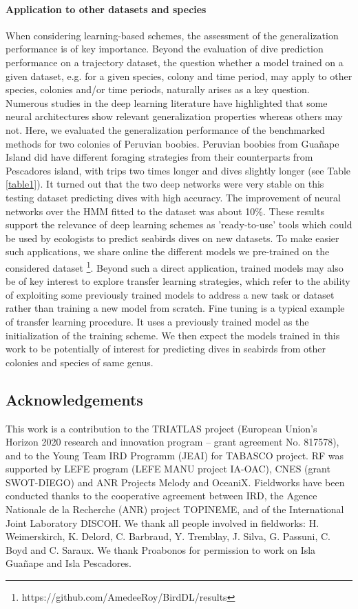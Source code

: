 \documentclass{article}
\begin{document}
\paragraph{Application to other datasets and species}
When considering learning-based schemes, the assessment of the generalization performance is of key importance. Beyond the evaluation of dive prediction performance on a trajectory dataset, the question whether a model trained on a given dataset, e.g. for a given species, colony and time period, may apply to other species, colonies and/or time periods, naturally arises as a key question. Numerous studies in the deep learning literature \citep{kawaguchi_generalization_2020,zhang_understanding_2017} have highlighted that some neural architectures show relevant generalization properties whereas others may not.
Here, we evaluated the generalization performance of the benchmarked methods for two colonies of Peruvian boobies.
Peruvian boobies from  Gua\~nape Island did have different foraging strategies from their counterparts from Pescadores island, with trips two times longer and dives slightly longer (see Table \ref{table1}). It turned out that the two deep networks were very stable on this testing dataset predicting dives with high accuracy. The improvement of neural networks over the HMM fitted to the dataset was about 10\%.
These results support the relevance of deep learning schemes as 
'ready-to-use' tools which could be used by ecologists to predict 
seabirds dives on new datasets. To make easier such applications, we share online the different models we pre-trained on the considered dataset \footnote{https://github.com/AmedeeRoy/BirdDL/results}. 
Beyond such a direct application, trained models may also be of key interest to explore transfer learning strategies, which refer to the ability of exploiting some previously trained models to address a new task or dataset rather than training a new model from scratch. Fine tuning is a typical example of transfer learning procedure. It uses a previously trained model as the initialization of the training scheme. We then expect the models trained in this work to be potentially of interest for predicting dives in seabirds from other colonies and species of same genus.       

\subsection*{Acknowledgements}
This work is a contribution to the TRIATLAS project (European Union's Horizon 2020 research and innovation program – grant agreement No. 817578), and to the Young Team IRD Programm (JEAI) for TABASCO project. RF was supported by LEFE program (LEFE MANU project IA-OAC), CNES (grant SWOT-DIEGO) and ANR Projects Melody and OceaniX. Fieldworks have been conducted thanks to the cooperative agreement between IRD, the Agence Nationale de la Recherche (ANR) project TOPINEME, and of the International Joint Laboratory DISCOH. We thank all people involved in fieldworks: H. Weimerskirch, K. Delord, C. Barbraud, Y. Tremblay, J. Silva, G. Passuni, C. Boyd and C. Saraux. We thank Proabonos for permission to work on Isla Gua\~nape  and Isla Pescadores. 
\end{document}
